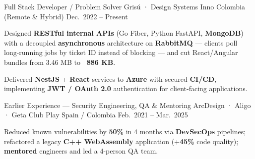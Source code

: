 \begin{cventries}
  \cventry
  {Full Stack Developer / Problem Solver}
  {Grisú · Design Systems Inno}
  {Colombia (Remote \& Hybrid)}
  {Dec.\ 2022 -- Present}
  {
    \begin{cvitems}
      \item {Designed \textbf{RESTful internal APIs} (Go Fiber, Python FastAPI, \textbf{MongoDB}) with a decoupled \textbf{asynchronous} architecture on \textbf{RabbitMQ} --- clients poll long-running jobs by ticket ID instead of blocking --- and cut React/Angular bundles from 3.46 MB to \textbf{~886 KB}.}
      \item {Delivered \textbf{NestJS} + \textbf{React} services to \textbf{Azure} with secured \textbf{CI/CD}, implementing \textbf{JWT / OAuth 2.0} authentication for client-facing applications.}
    \end{cvitems}
  }

  \cventry
  {Earlier Experience --- Security Engineering, QA \& Mentoring}
  {ArcDesign · Aligo · Geta Club Play}
  {Spain / Colombia}
  {Feb.\ 2021 -- Mar.\ 2025}
  {
    \begin{cvitems}
      \item {Reduced known vulnerabilities by \textbf{50\%} in 4 months via \textbf{DevSecOps} pipelines; refactored a legacy \textbf{C++ WebAssembly} application (+\textbf{45\%} code quality); \textbf{mentored} engineers and led a 4-person QA team.}
    \end{cvitems}
  }

\end{cventries}
